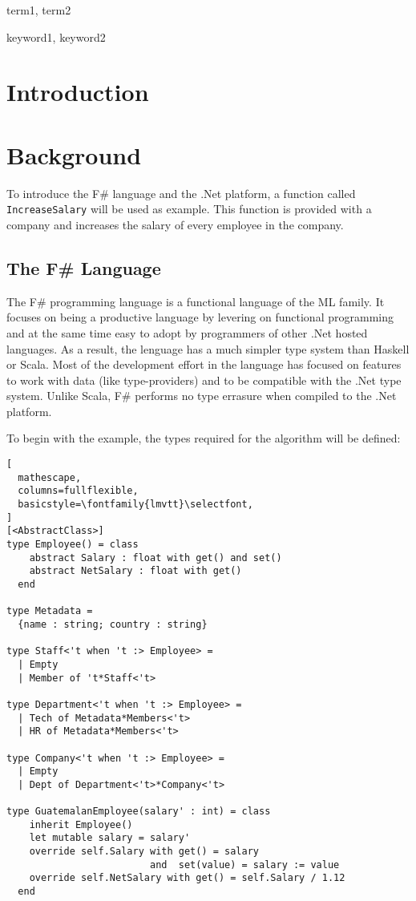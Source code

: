 \documentclass{sigplanconf}
\begin{document}

\terms
term1, term2

\keywords
keyword1, keyword2

\section{Introduction}

\section{Background}
To introduce the F\# language and the .Net platform, a function called
\verb+IncreaseSalary+ will be used as example. This function is
provided with a company and increases the salary of every employee in
the company.
\subsection{The F\# Language}
The F\# programming language is a functional language of the ML
family. It focuses on being a productive language by levering on
functional programming and at the same time easy to adopt by
programmers of other .Net hosted languages. As a result, the lenguage
has a much simpler type system than Haskell or Scala. Most of the
development effort in the language has focused on features to work
with data (like type-providers) and to be compatible with the .Net
type system. Unlike Scala, F\# performs no type errasure when compiled
to the .Net platform.

To begin with the example, the types required for the algorithm will be defined:
\begin{lstlisting}[
  mathescape,
  columns=fullflexible,
  basicstyle=\fontfamily{lmvtt}\selectfont,
]
[<AbstractClass>]
type Employee() = class
    abstract Salary : float with get() and set()
    abstract NetSalary : float with get()
  end

type Metadata = 
  {name : string; country : string}

type Staff<'t when 't :> Employee> =
  | Empty
  | Member of 't*Staff<'t>

type Department<'t when 't :> Employee> =
  | Tech of Metadata*Members<'t>
  | HR of Metadata*Members<'t>

type Company<'t when 't :> Employee> =
  | Empty
  | Dept of Department<'t>*Company<'t>

type GuatemalanEmployee(salary' : int) = class
    inherit Employee()
    let mutable salary = salary'
    override self.Salary with get() = salary
                         and  set(value) = salary := value
    override self.NetSalary with get() = self.Salary / 1.12
  end
\end{lstlisting}
\end{document}
